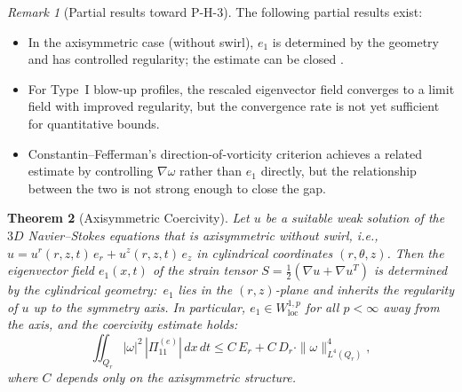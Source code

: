 \documentclass[11pt]{article}
\newtheorem{theorem}{Theorem}[section]
\theoremstyle{definition}
\theoremstyle{remark}
\newtheorem{remark}[theorem]{Remark}
\begin{document}
\begin{remark}[Partial results toward P-H-3]
The following partial results exist:
\begin{itemize}[nosep]
  \item In the axisymmetric case (without swirl), $e_1$ is determined by the
    geometry and has controlled regularity; the estimate can be closed \cite{CF}.
  \item For Type~I blow-up profiles, the rescaled eigenvector field converges to a
    limit field with improved regularity, but the convergence rate is not yet
    sufficient for quantitative bounds.
  \item Constantin--Fefferman's direction-of-vorticity criterion \cite{CF} achieves
    a related estimate by controlling $\nabla\hat\omega$ rather than $e_1$ directly,
    but the relationship between the two is not strong enough to close the gap.
\end{itemize}
\end{remark}


\begin{theorem}[Axisymmetric Coercivity]\label{thm:axi-coercivity}
Let $u$ be a suitable weak solution of the $3D$ Navier--Stokes equations that is
axisymmetric without swirl, i.e., $u = u^r(r,z,t)\,e_r + u^z(r,z,t)\,e_z$ in
cylindrical coordinates $(r,\theta,z)$.  Then the eigenvector field $e_1(x,t)$
of the strain tensor $S = \tfrac{1}{2}(\nabla u + \nabla u^T)$ is determined
by the cylindrical geometry:\ $e_1$ lies in the $(r,z)$-plane and inherits the
regularity of $u$ up to the symmetry axis.  In particular, $e_1 \in W^{1,p}_{\mathrm{loc}}$
for all $p < \infty$ away from the axis, and the coercivity estimate holds:
\begin{equation}\label{eq:axi-coercivity}
  \iint_{Q_r} |\omega|^2\, |\Pi_{11}^{(e)}|\, dx\, dt
  \leq C\, E_r + C\, D_r \cdot \|\omega\|_{L^4(Q_r)}^4,
\end{equation}
where $C$ depends only on the axisymmetric structure.
\end{theorem}
\end{document}
